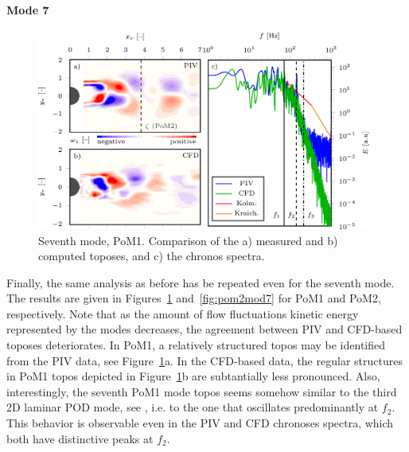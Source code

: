 {\paragraph{Mode 7}
\begin{figure}[htbp]
    \centering
    \includegraphics[width=0.98\textwidth]{02_images/00_export/figure17.png}
    \caption{{Seventh mode, PoM1.} Comparison of the a) measured and b) computed toposes, and c) the chronos spectra.}
    \label{fig:mod7}
\end{figure}
{Finally, the same analysis as before {has} be repeated even for the seventh mode. The results are given in Figures~\ref{fig:mod7} and~\ref{fig:pom2mod7} for PoM1 and PoM2, respectively. Note that as the amount of flow fluctuations kinetic energy represented by the modes decreases, the agreement between PIV and CFD-based toposes deteriorates. In PoM1, a relatively structured topos may be identified from the PIV data, see Figure~\ref{fig:mod7}a.  In the CFD-based data, {the regular structures in PoM1 topos depicted in Figure~\ref{fig:mod7}b are subtantially less pronounced. Also, interestingly, the seventh PoM1 mode topos seems somehow similar to the third 2D laminar POD mode, see \citep{taira2020}, i.e. to the one that oscillates predominantly at $f_{2}$. This behavior is observable even in the PIV and CFD chronoses spectra, which both have distinctive peaks at $f_{2}$.}}


}
